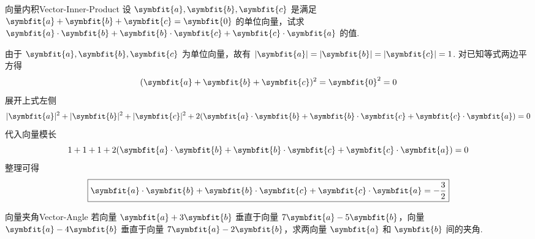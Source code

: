 \begin{problem}{向量内积}{Vector-Inner-Product}
    设 $\symbfit{a}, \symbfit{b}, \symbfit{c}$ 是满足 $\symbfit{a} + \symbfit{b} + \symbfit{c} = \symbfit{0}$ 的单位向量，试求 $\symbfit{a} \cdot \symbfit{b} + \symbfit{b} \cdot \symbfit{c} + \symbfit{c} \cdot \symbfit{a}$ 的值.
\end{problem}

\begin{solution}
    由于 $\symbfit{a}, \symbfit{b}, \symbfit{c}$ 为单位向量，故有 $|\symbfit{a}| = |\symbfit{b}| = |\symbfit{c}| = 1$. 对已知等式两边平方得
    \begin{equation*}
        (\symbfit{a} + \symbfit{b} + \symbfit{c})^2 = \symbfit{0}^2 = 0
    \end{equation*}
    展开上式左侧
    \begin{equation*}
        |\symbfit{a}|^2 + |\symbfit{b}|^2 + |\symbfit{c}|^2 + 2(\symbfit{a} \cdot \symbfit{b} + \symbfit{b} \cdot \symbfit{c} + \symbfit{c} \cdot \symbfit{a}) = 0
    \end{equation*}
    代入向量模长
    \begin{equation*}
        1 + 1 + 1 + 2(\symbfit{a} \cdot \symbfit{b} + \symbfit{b} \cdot \symbfit{c} + \symbfit{c} \cdot \symbfit{a}) = 0
    \end{equation*}
    整理可得
    \begin{equation*}
        \boxed{\symbfit{a} \cdot \symbfit{b} + \symbfit{b} \cdot \symbfit{c} + \symbfit{c} \cdot \symbfit{a} = -\frac{3}{2}}
    \end{equation*}
\end{solution}

\begin{problem}{向量夹角}{Vector-Angle}
    若向量 $\symbfit{a} + 3\symbfit{b}$ 垂直于向量 $7\symbfit{a} - 5\symbfit{b}$，向量 $\symbfit{a} - 4\symbfit{b}$ 垂直于向量 $7\symbfit{a} - 2\symbfit{b}$，求两向量 $\symbfit{a}$ 和 $\symbfit{b}$ 间的夹角.
\end{problem}

